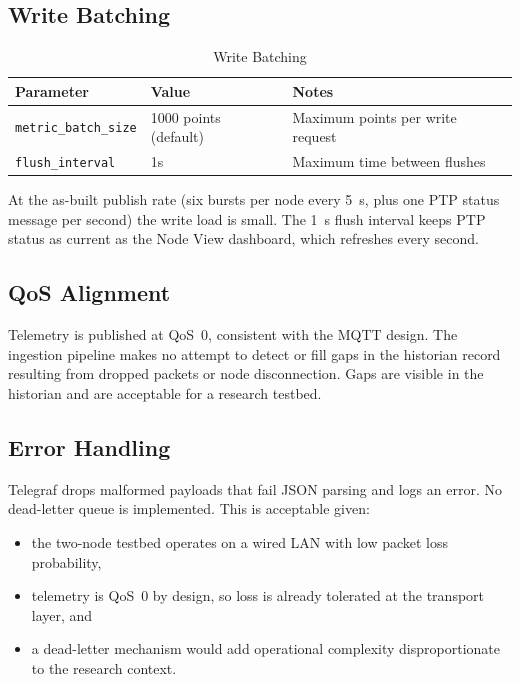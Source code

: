 \subsection{Write Batching}
\begin{table}[H]
  \caption{Write Batching}
  \begin{center}
    \begin{tabular}{lll}
      \hline
      \textbf{Parameter} & \textbf{Value} & \textbf{Notes} \\
      \hline
      \texttt{metric\_batch\_size} & 1000 points (default) & Maximum points per write request \\
      \texttt{flush\_interval} & 1s & Maximum time between flushes \\
      \hline
    \end{tabular}
  \end{center}
\end{table}
At the as-built publish rate (six bursts per node every 5~s, plus one PTP status message per second) the write load is small. The 1~s flush interval keeps PTP status as current as the Node View dashboard, which refreshes every second.

\subsection{QoS Alignment}
Telemetry is published at QoS~0, consistent with the MQTT design. The ingestion pipeline makes no attempt to detect or fill gaps in the historian record resulting from dropped packets or node disconnection. Gaps are visible in the historian and are acceptable for a research testbed.

\subsection{Error Handling}
Telegraf drops malformed payloads that fail JSON parsing and logs an error. No dead-letter queue is implemented. This is acceptable given:
\begin{itemize}[noitemsep]
  \item the two-node testbed operates on a wired LAN with low packet loss probability,
  \item telemetry is QoS~0 by design, so loss is already tolerated at the transport layer, and
  \item a dead-letter mechanism would add operational complexity disproportionate to the research context.
\end{itemize}
